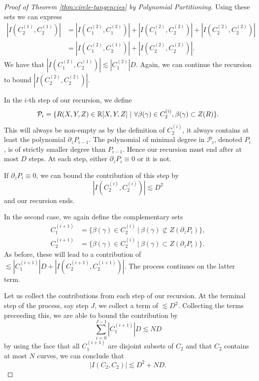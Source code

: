 \begin{proof}[Proof of Theorem \ref{thm:circle-tangencies} by Polynomial Partitioning]
Using these sets we can express 
\begin{align*}
    \left|I\left(C_2^{(1)},C_2^{(1)}\right)\right| &= \left| I\left(C_1^{(2)}, C_1^{(2)}\right) \right|+ \left|I\left(C_1^{(2)}, C_2^{(2)}\right)\right| +\left| I\left(C_2^{(2)}, C_2^{(2)}\right)\right| \\
    &= \left|I\left(C_1^{(2)}, C_2^{(1)}\right)\right| +\left| I\left(C_2^{(2)}, C_2^{(2)}\right)\right|. 
\end{align*}
We have that $\left|  I\left(C_1^{(2)}, C_2^{(1)}\right)\right| \lesssim \left|C_1^{(2)} \right| D$. Again, we can continue the recursion to bound $\left|I \left(C_2^{(2)}, C_2^{(2)}\right)\right|.$

In the $i$-th step of our recursion, we define
\[
    \mathcal P_i  = \{ R(X,Y,Z) \in \mathbb R[X,Y,Z] \ | \ \forall \beta(\gamma) \in C_2^{(i)}, \beta(\gamma) \subset Z(R) \}. 
\]
This will always be non-empty as by the definition of $C_2^{(i)}$, it always contains at least the polynomial $\partial_z P_{i-1}$. The polynomial of minimal degree in $\mathcal P_i$, denoted $P_i$, is of strictly smaller degree than $P_{i-1}$. Hence our recursion must end after at most $D$ steps. At each step, either $\partial_z P_i \equiv 0$ or it is not. 

If $\partial_z P_i \equiv 0$, we can bound the contribution of this step by 
\[\left|I\left(C_2^{(i)},C_2^{(i)}\right)\right| \lesssim D^2\] 
and our recursion ends.

In the second case, we again define the complementary sets
\begin{align*}
    C_1^{(i+1)} &= \{ \beta(\gamma) \in C_2^{(i)} \ | \  \beta(\gamma) \not \subset Z(\partial_z P_i)  \}, \\
    C_2^{(i+1)} &=  \{ \beta(\gamma) \in C_2^{(i)} \ | \  \beta(\gamma) \subset Z(\partial_z P_i)  \}.
\end{align*}
As before, these will lead to a contribution of $\lesssim \left|  C_1^{(i+1)}\right| D + \left|I \left( C_2^{(i+1)},C_2^{(i+1)} \right) \right|$. The process continues on the latter term.

Let us collect the contributions from each step of our recursion. At the terminal step of the process, say step $J$,  we collect a term of $\lesssim D^2$. Collecting the terms preceeding this, we are able to bound the contribution by 
\[
    \sum_{i=0}^{J-1} \left| C_1^{(i+1)} \right| D \lesssim N D
\]
by using the face that all $ C_1^{(i+1)}$ are disjoint subsets of $C_2$ and that $C_2$ contains at most $N$ curves, we can conclude that
\[
  |I(C_2,C_2)| \lesssim D^2 + ND.
\]



\end{proof}
